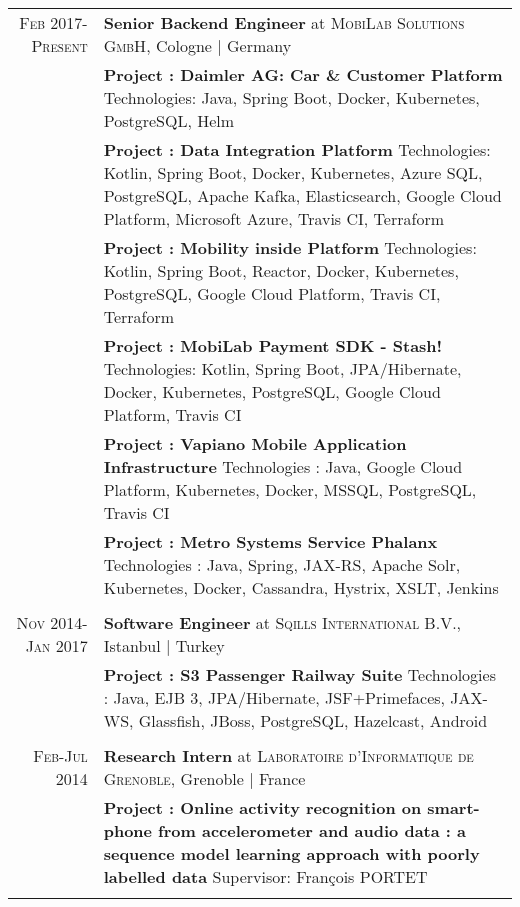 \documentclass[a4paper,10pt]{article} %
\begin{document}
\begin{tabular}{r|p{13cm}}

\textsc{Feb 2017-Present} & \textbf{Senior Backend Engineer} at \textsc{MobiLab Solutions GmbH}, Cologne | Germany \emph{}\\
& \footnotesize{\textbf{Project : Daimler AG: Car \& Customer Platform}
\newline
Technologies: Java, Spring Boot, Docker, Kubernetes, PostgreSQL, Helm
}\\
\newline
& \footnotesize{\textbf{Project : Data Integration Platform}
\newline
Technologies: Kotlin, Spring Boot, Docker, Kubernetes, Azure SQL, PostgreSQL, Apache Kafka, Elasticsearch, Google Cloud Platform, Microsoft Azure, Travis CI, Terraform
}\\
& \footnotesize{\textbf{Project : Mobility inside Platform}
\newline
Technologies: Kotlin, Spring Boot, Reactor, Docker, Kubernetes, PostgreSQL, Google Cloud Platform, Travis CI, Terraform
}\\
& \footnotesize{\textbf{Project : MobiLab Payment SDK - Stash!}
\newline
Technologies: Kotlin, Spring Boot, JPA/Hibernate, Docker, Kubernetes, PostgreSQL, Google Cloud Platform, Travis CI 
}\\
& \footnotesize{\textbf{Project : Vapiano Mobile Application Infrastructure}
\newline
Technologies : Java, Google Cloud Platform, Kubernetes, Docker, MSSQL, PostgreSQL, Travis CI  
}\\
& \footnotesize{\textbf{Project : Metro Systems Service Phalanx}
\newline
Technologies : Java, Spring, JAX-RS, Apache Solr, Kubernetes, Docker, Cassandra, Hystrix, XSLT, Jenkins 
}\\
\multicolumn{2}{c}{} \\

\textsc{Nov 2014-Jan 2017} & \textbf{Software Engineer} at \textsc{Sqills International B.V.}, Istanbul | Turkey \emph{}\\
& \footnotesize{\textbf{Project : S3 Passenger Railway Suite}
\newline
Technologies : Java, EJB 3, JPA/Hibernate, JSF+Primefaces, JAX-WS, Glassfish, JBoss, PostgreSQL, Hazelcast, Android
}\\
\multicolumn{2}{c}{} \\


\textsc{Feb-Jul 2014} & \textbf{Research Intern} at \textsc{Laboratoire d'Informatique de Grenoble}, Grenoble | France \emph{}\\
& \footnotesize{\textbf{Project : Online activity recognition on smart-phone from accelerometer and audio data : a sequence model learning approach with poorly labelled data}
\newline
Supervisor: François PORTET
}\\
\multicolumn{2}{c}{} \\

\end{tabular}
\end{document}
